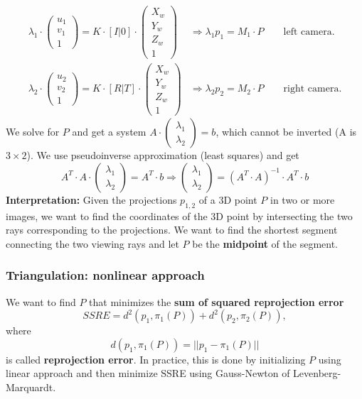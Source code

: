 \documentclass[a4paper,12 pt]{article}
\theoremstyle{definition}
\theoremstyle{remark}
\theoremstyle{definition}
\theoremstyle{definition}
\theoremstyle{definition}
\theoremstyle{remark}
\theoremstyle{definition}
\begin{document}
\begin{equation}
\begin{split}
\lambda_1\cdot \begin{pmatrix}
 u_1\\
 v_1\\
 1
 \end{pmatrix}=K\cdot [I|0]\cdot \begin{pmatrix}
 X_w\\
 Y_w\\
 Z_w\\
 1
 \end{pmatrix}&\Rightarrow \lambda_1p_1=M_1\cdot P \qquad \text{left camera}. \\
 \lambda_2\cdot \begin{pmatrix}
 u_2\\
 v_2\\
 1
 \end{pmatrix}=K\cdot [R|T]\cdot \begin{pmatrix}
 X_w\\
 Y_w\\
 Z_w\\
 1
 \end{pmatrix}&\Rightarrow \lambda_2p_2=M_2\cdot P \qquad \text{right camera}.
\end{split}
\end{equation}
We solve for $P$ and get a system $A\cdot \begin{pmatrix} \lambda_1 \\\lambda_2 \end{pmatrix}=b$, which cannot be inverted (A is $3\times 2$). We use pseudoinverse approximation (least squares) and get
\begin{equation}
A^T\cdot A\cdot \begin{pmatrix}
 \lambda_1\\
 \lambda_2
 \end{pmatrix}=A^T\cdot b \Rightarrow \begin{pmatrix}
 \lambda_1\\
 \lambda_2
 \end{pmatrix}=(A^T\cdot A)^{-1}\cdot A^T\cdot b
\end{equation}
\textbf{Interpretation:} Given the projections $p_{1,2}$ of a 3D point $P$ in two or more images, we want to find the coordinates of the 3D point by intersecting the two rays corresponding to the projections. We want to find the shortest segment connecting the two viewing rays and let $P$ be the \textbf{midpoint} of the segment.
\subsubsection*{Triangulation: nonlinear approach}
We want to find $P$ that minimizes the \textbf{sum of squared reprojection error}
\begin{equation}
SSRE=d^2(p_1,\pi_1(P))+d^2(p_2,\pi_2(P)),
\end{equation}
where 
\begin{equation}
d(p_1,\pi_1(P))=||p_1-\pi_1(P)||
\end{equation}
is called \textbf{reprojection error}. In practice, this is done by initializing $P$ using linear approach and then minimize SSRE using Gauss-Newton of Levenberg-Marquardt.
\end{document}
